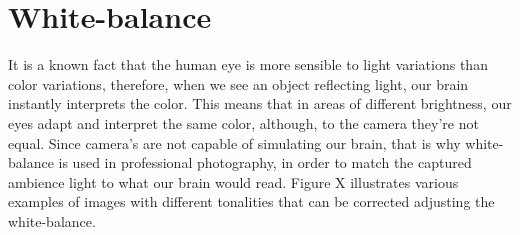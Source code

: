 \section{White-balance}

It is a known fact that the human eye is more sensible to light variations than color variations, therefore, when we see an object reflecting light, our brain instantly interprets the color. This means that in areas of different brightness, our eyes adapt and interpret the same color, although, to the camera they’re not equal.
Since camera’s are not capable of simulating our brain, that is why white-balance is used in professional photography, in order to match the captured ambience light to what our brain would read. Figure X illustrates various examples of images with different tonalities that can be corrected adjusting the white-balance.